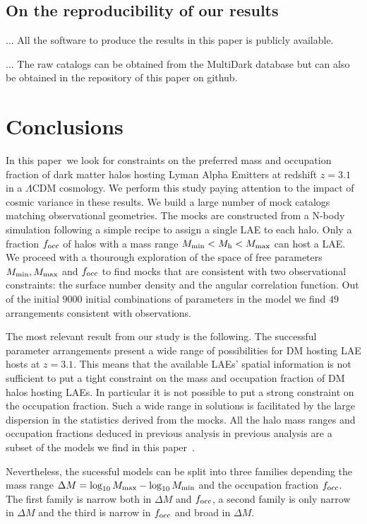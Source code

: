 \documentclass[usenatbib]{mn2e}
\newcommand{\documentname}{paper~}
\begin{document}
\subsection{On the reproducibility of our results}

... All the software to produce the results in this paper is publicly
available. 

... The raw catalogs can be obtained from the MultiDark database but
can also be obtained in the repository of this paper on github.

\section{Conclusions}
\label{sec:conclusions}

In this \documentname we look for constraints on the preferred mass
and occupation fraction of dark matter halos hosting Lyman Alpha Emitters at
redshift $z=3.1$ in a $\Lambda$CDM cosmology. We perform this study
paying attention to the impact of cosmic variance in these results. We
build a large number of mock catalogs matching observational
geometries. The mocks are constructed from a N-body simulation
following a simple recipe to assign a single LAE to each halo. Only
a fraction $f_{\rm occ}$ of halos with a mass range  $M_{\rm
  min}<M_{\rm h}<M_{\rm   max}$ can host a LAE. We proceed with a
thourough exploration of the space of free parameters $M_{\rm min},
M_{\rm max}$ and $f_{\rm occ}$ to find mocks that are consistent with
two observational constraints: the surface number density and the
angular correlation function. Out of the initial $9000$ initial
combinations of parameters in the model we find $49$ arrangements
consistent with observations.


The most relevant result from our study is the following. The 
successful parameter arrangements present a wide range of possibilities for
DM hosting LAE hosts at $z=3.1$. This means that the available LAEs' spatial
information is not sufficient to put a tight constraint on the mass
and occupation fraction of DM halos hosting LAEs. In particular it is
not possible to put a strong constraint on the occupation
fraction. Such a wide range in solutions is facilitated by the large
dispersion in the statistics derived from the mocks. All the halo mass
ranges and occupation fractions deduced in previous analysis in
previous analysis \citep[i.e.][]{Gawiser2007} are a subset of the
models we find in this \documentname.  
 

Nevertheless, the sucessful models can be split into three families
depending the mass range $\Delta M=\log_{10}M_{\rm max} -
\log_{10}M_{\rm min}$ and the occupation fraction $f_{\rm occ}$. The
first family is narrow both in $\Delta M$ and $f_{\rm occ}$, a second
family is only narrow in $\Delta M$ and the third is narrow in $f_{\rm
  occ}$ and broad in $\Delta M$. 
\end{document}

